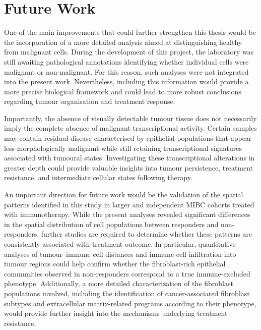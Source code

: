 \setchapterpreamble[u]{\margintoc}
\chapter{Future Work}

One of the main improvements that could further strengthen this thesis would be the incorporation of a more detailed analysis aimed at distinguishing healthy from malignant cells. During the development of this project, the laboratory was still awaiting pathological annotations identifying whether individual cells were malignant or non-malignant. For this reason, such analyses were not integrated into the present work. Nevertheless, including this information would provide a more precise biological framework and could lead to more robust conclusions regarding tumour organisation and treatment response.

Importantly, the absence of visually detectable tumour tissue does not necessarily imply the complete absence of malignant transcriptional activity. Certain samples may contain residual disease characterised by epithelial populations that appear less morphologically malignant while still retaining transcriptional signatures associated with tumoural states. Investigating these transcriptional alterations in greater depth could provide valuable insights into tumour persistence, treatment resistance, and intermediate cellular states following therapy.

An important direction for future work would be the validation of the spatial patterns identified in this study in larger and independent MIBC cohorts treated with immunotherapy. While the present analyses revealed significant differences in the spatial distribution of cell populations between responders and non-responders, further studies are required to determine whether these patterns are consistently associated with treatment outcome. In particular, quantitative analyses of tumour--immune cell distances and immune-cell infiltration into tumour regions could help confirm whether the fibroblast-rich epithelial communities observed in non-responders correspond to a true immune-excluded phenotype. Additionally, a more detailed characterization of the fibroblast populations involved, including the identification of cancer-associated fibroblast subtypes and extracellular matrix-related programs according to their phenotype, would provide further insight into the mechanisms underlying treatment resistance.

